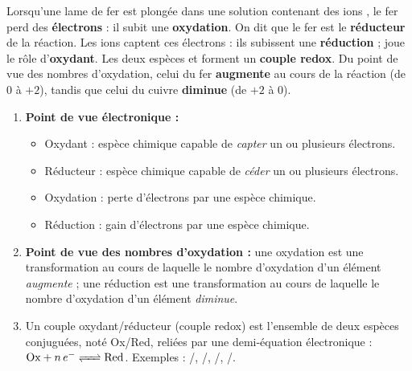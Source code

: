 \documentclass[11pt]{article}
\newcommand{\cle}[1]{{\popxbold\color{popdark}#1}}
\begin{document}
\begin{corrige}
Lorsqu'une lame de fer est plongée dans une solution contenant des ions , le fer perd des \textbf{électrons} : il subit une \textbf{oxydation}. On dit que le fer est le \textbf{réducteur} de la réaction. Les ions  captent ces électrons : ils subissent une \textbf{réduction} ;  joue le rôle d'\textbf{oxydant}. Les deux espèces  et  forment un \textbf{couple redox}. Du point de vue des nombres d'oxydation, celui du fer \textbf{augmente} au cours de la réaction (de $0$ à $+2$), tandis que celui du cuivre \textbf{diminue} (de $+2$ à $0$).
\end{corrige}

\begin{corrige}
\begin{enumerate}
\item \textbf{Point de vue électronique :}
\begin{itemize}
\item \cle{Oxydant} : espèce chimique capable de \emph{capter} un ou plusieurs électrons.
\item \cle{Réducteur} : espèce chimique capable de \emph{céder} un ou plusieurs électrons.
\item \cle{Oxydation} : perte d'électrons par une espèce chimique.
\item \cle{Réduction} : gain d'électrons par une espèce chimique.
\end{itemize}
\item \textbf{Point de vue des nombres d'oxydation :} une oxydation est une transformation au cours de laquelle le nombre d'oxydation d'un élément \emph{augmente} ; une réduction est une transformation au cours de laquelle le nombre d'oxydation d'un élément \emph{diminue}.
\item Un \cle{couple oxydant/réducteur} (couple redox) est l'ensemble de deux espèces conjuguées, noté Ox/Red, reliées par une demi-équation électronique : $\text{Ox} + n\,e^- \ce{<=>} \text{Red}$. Exemples : /, /, /, /.
\end{enumerate}
\end{corrige}
\end{document}
